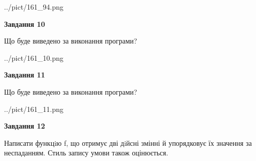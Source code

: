 \documentclass[12pt, ukrainian]{article}
\begin{document}
{\begin {large}
\begin{center}
	{../pict/161_94.png}
\end{center}
\newpage

{\begin {center}\textbf{Завдання 10}\end {center}}

Що буде виведено за виконання програми?\par
\begin{center}
	{../pict/161_10.png}
\end{center}
\newpage

{\begin {center}\textbf{Завдання 11}\end {center}}

Що буде виведено за виконання програми?\par
\begin{center}
	{../pict/161_11.png}
\end{center}
\newpage

{\begin {center}\textbf{Завдання 12}\end {center}}


Написати функцiю f, що отримує дві дiйсні змінні й упорядковує їх значення за неспаданням. Стиль запису умови також оцінюється.\par
\newpage

\end {large}}
\end{document}
